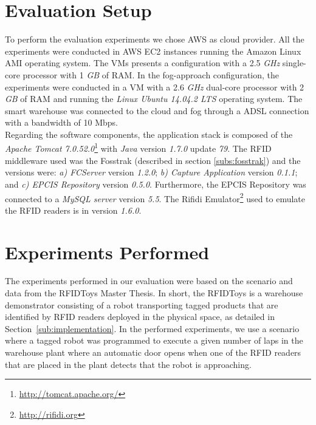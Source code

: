 \section{Evaluation Setup}
\label{sec:eval_setup}
To perform the evaluation experiments we chose \gls{AWS} as cloud provider. All the experiments were
conducted in \gls{AWS} \gls{EC2} instances running the Amazon Linux \gls{AMI} operating system. The \glspl{VM}
presents a configuration with a 2.5 \textit{\gls{GHz}} single-core processor with 1 \textit{\gls{GB}} of
\gls{RAM}. In the fog-approach configuration, the experiments were conducted in a \gls{VM} with
a 2.6 \textit{\gls{GHz}} dual-core processor with 2 \textit{\gls{GB}} of \gls{RAM} and running
the \textit{Linux Ubuntu 14.04.2 LTS} operating system. The smart warehouse was connected to the cloud
and fog through a \gls{ADSL} connection with a bandwidth of 10 Mbps.\\

Regarding the software components, the application stack is composed of the \textit{Apache Tomcat 7.0.52.0}\footnote{\url{http://tomcat.apache.org/}}
with \textit{Java} version \textit{1.7.0} update \textit{79}. The \gls{RFID} middleware used was the Fosstrak
(described in section \ref{subs:fosstrak}) and the versions were: \textit{a) \gls{FCServer}} version
\textit{1.2.0}; \textit{b) Capture Application} version \textit{0.1.1}; and \textit{c) \gls{EPCIS} Repository}
version \textit{0.5.0}. Furthermore, the \gls{EPCIS} Repository was connected to a \textit{MySQL server}
version \textit{5.5}. The Rifidi Emulator\footnote{\url{http://rifidi.org}} used to emulate the \gls{RFID}
readers is in version \textit{1.6.0}.

\section{Experiments Performed}
\label{sec:eval_experiments}
The experiments performed in our evaluation were based on the scenario and data from the RFIDToys \cite{Correia:Thesis:2014}
Master Thesis. In short, the RFIDToys is a warehouse demonstrator consisting of a robot transporting
tagged products that are identified by RFID readers deployed in the physical space, as detailed in
Section~\ref{sub:implementation}. In the performed experiments, we use a scenario where a tagged
robot was programmed to execute  a given number of laps in the warehouse plant where an automatic
door opens when one of the RFID readers that are placed in the plant detects that the robot is
approaching.\\

